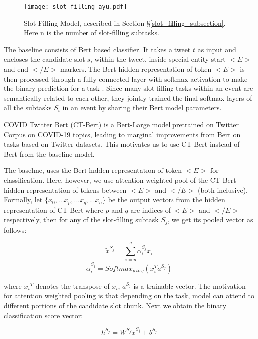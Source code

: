 \documentclass[11pt,a4paper]{article}
\begin{document}
\begin{figure}
\centering
\texttt{[image: slot\_filling\_ayu.pdf]}
    \caption{Slot-Filling Model, described in Section \S\ref{slot_filling_subsection}. Here n is the number of slot-filling subtasks. }
    \label{fig:model_slot}
\end{figure}

The baseline consists of Bert based classifier. It takes a tweet $t$ as input and encloses the candidate slot $s$, within the tweet, inside special entity start $< E>$ and end $</E>$ markers. The Bert hidden representation of token $<E>$ is then processed through a fully connected layer with softmax activation to make the binary prediction for a task \cite{baldinisoares-etal-2019matching}. Since many slot-filling tasks within an event are semantically related to each other, they jointly trained the final softmax layers of all the subtasks $S_i$ in an event by sharing their Bert model parameters.

COVID Twitter Bert (CT-Bert) is a Bert-Large model pretrained on Twitter Corpus on COVID-19 topics, leading to marginal improvements from Bert on tasks based on Twitter datasets\cite{ctbert}. This motivates us to use CT-Bert instead of Bert from the baseline model.

The baseline, uses the Bert hidden representation of token $<E>$ for classification. Here, however, we use attention-weighted pool of the CT-Bert hidden representation of tokens between $<E>$ and $</E>$ (both inclusive). Formally, let $\{x_0, ... x_p, ... x_q, ...x_n \}$ be the output vectors from the hidden representation of CT-Bert where $p$ and $q$ are indices of $<E>$ and $</E>$ respectively, then for any of the slot-filling subtask $S_j$, we get its pooled vector as follows:

\begin{equation}
\widetilde{x}^{S_j} = \sum_{i=p}^{q}\alpha_i^{S_j}x_i \end{equation}
$$\alpha_i^{S_j} = Softmax_{p\ to\ q}(x_i^T a^{S_j})$$

where ${x_i}^T$ denotes the transpose of $x_i$, $a^{S_j}$ is a trainable vector. The motivation for attention weighted pooling is that depending on the task, model can attend to different portions of the candidate slot chunk. Next we obtain the binary classification score vector:

\begin{equation}
\displaystyle{h^{S_j} = W^{S_j}\widetilde{x}^{S_j} + b^{S_j}}
\label{eq-1}
\end{equation}
\end{document}
